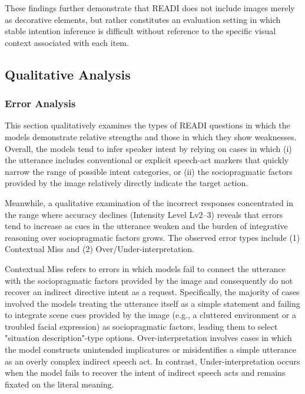\documentclass[11pt]{article}
\begin{document}
These findings further demonstrate that READI does not include images merely as decorative elements, but rather constitutes an evaluation setting in which stable intention inference is difficult without reference to the specific visual context associated with each item.



\subsection{Qualitative Analysis}
\subsubsection{Error Analysis}
This section qualitatively examines the types of READI questions in which the models demonstrate relative strengths and those in which they show weaknesses. Overall, the models tend to infer speaker intent by relying on cases in which (i) the utterance includes conventional or explicit speech-act markers that quickly narrow the range of possible intent categories, or (ii) the sociopragmatic factors provided by the image relatively directly indicate the target action.

Meanwhile, a qualitative examination of the incorrect responses concentrated in the range where accuracy declines (Intensity Level Lv2–3) reveals that errors tend to increase as cues in the utterance weaken and the burden of integrative reasoning over sociopragmatic factors grows. The observed error types include (1) Contextual Miss and (2) Over/Under-interpretation.

Contextual Miss refers to errors in which models fail to connect the utterance with the sociopragmatic factors provided by the image and consequently do not recover an indirect directive intent as a request. Specifically, the majority of cases involved the models treating the utterance itself as a simple statement and failing to integrate scene cues provided by the image (e.g., a cluttered environment or a troubled facial expression) as sociopragmatic factors, leading them to select "situation description"-type options. Over-interpretation involves cases in which the model constructs unintended implicatures or misidentifies a simple utterance as an overly complex indirect speech act. In contrast, Under-interpretation occurs when the model fails to recover the intent of indirect speech acts and remains fixated on the literal meaning.
\end{document}

